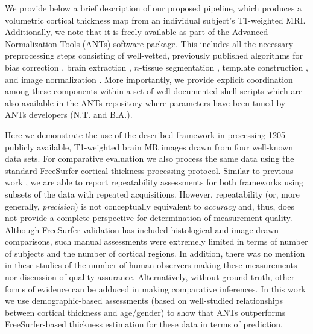 We provide below a brief description of our proposed pipeline, which produces a volumetric
cortical thickness map from an individual subject's T1-weighted MRI.
Additionally, we note that it is freely available as part of the Advanced Normalization Tools
(ANTs) software package.
This includes all the necessary preprocessing steps consisting
of well-vetted, previously published algorithms for bias correction \citep{tustison2010},
brain extraction \citep{avants2010a}, $n$-tissue segmentation \citep{avants2011a},
template construction \citep{avants2010}, and image normalization \citep{avants2011}.
More importantly, we provide explicit coordination among
these components within a set of well-documented shell scripts%
which are also available in the ANTs repository where parameters have been tuned
by ANTs developers (N.T. and B.A.).  

Here we demonstrate the use of the described framework in processing
1205 publicly available, T1-weighted brain MR images drawn from four
well-known data sets.  For comparative evaluation we also process the
same data using the standard FreeSurfer cortical thickness processing
protocol.  Similar to previous work \citep[e.g.,][]{clarkson2011}, we
are able to report repeatability assessments for both frameworks using
subsets of the data with repeated acquisitions.
However, repeatability (or, more generally, {\it precision}) is not
conceptually equivalent to {\it accuracy} and, thus, does not provide
a complete perspective for determination of measurement quality.
Although FreeSurfer validation has included histological
\citep{rosas2002} and image-drawn \citep{kuperberg2003} comparisons,
such manual assessments were extremely limited in terms of number of
subjects and the number of cortical regions.  In addition, there was
no mention in these studies of the number of human observers making
these measurements nor discussion of quality assurance.
Alternatively, without ground truth, other forms of evidence can be
adduced \citep[e.g.,][]{bouix2007} in making comparative inferences.
In this work we use demographic-based assessments 
(based on well-studied relationships between cortical thickness
and age/gender) to show that ANTs outperforms FreeSurfer-based thickness 
estimation for these data in terms of prediction.

